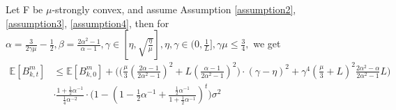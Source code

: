 \documentclass[11pt]{article}
\begin{document}
\begin{proposition} \label{propositionD.5}
Let F be $\mu$-strongly convex, and assume Assumption \ref{assumption2}, \ref{assumption3}, \ref{assumption4}, then for $\alpha=\frac{3}{2\gamma\mu} - \frac{1}{2}, \beta=\frac{2\alpha^2-1}{\alpha-1}, \gamma \in [\eta, \sqrt{\frac{\eta}{\mu}}], \eta, \gamma \in (0, \frac{1}{L}], \gamma\mu \leq \frac{3}{4},$ we get
\begin{align*}
    \mathbb{E}[B_{k, t}^m] &\leq \mathbb{E}[B_{k, 0}^m] + \bigg( \Big(\frac{\mu}{3} (\frac{2\alpha-1}{2\alpha^2 -1})^2 + L(\frac{\alpha-1}{2\alpha^2 -1})^2 \Big)\cdot(\gamma - \eta)^2+ \gamma^4 (\frac{\mu}{3} + L)^2 \frac{2\alpha^2 - \alpha}{2\alpha^2 - 1}L \bigg) \\
    &\cdot \frac{1 + \frac{1}{2}\alpha^{-1}}{\frac{1}{4}\alpha^{-2}} \cdot \Big( 1-(1-\frac{1}{2}\alpha^{-1}+\frac{\frac{1}{2}\alpha^{-1}}{1+\frac{1}{2}\alpha^{-1}})^t\Big)\sigma^2
\end{align*}
\end{proposition}
\end{document}
